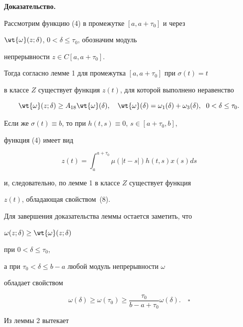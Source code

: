{\bf Доказательство.}


Рассмотрим функцию (4) в промежутке $[a,a+\tau_0]$ и через


$\wt{\omega}(z;\delta)$, $0<\delta\leq \tau_0$, обозначим модуль


непрерывности $z\in C[a,a+\tau_0]$.


Тогда согласно лемме 1 для промежутка $[a,a+\tau_0]$ при $\sigma(t)=t$


в классе $Z$ существует функция $z(t)$, для которой выполнено неравенство


\begin{equation}


\wt{\omega}(z;\delta)\geq A_{18}\wt{\omega}(\delta),\quad


\wt{\omega}(\delta)=\omega_1(\delta)+\omega_3(\delta),\ \;


0<\delta\leq \tau_0.


\end{equation}


Если же $\sigma(t)\equiv b$, то при $h(t,s)\equiv 0$, $s\in [a+\tau_0,b]$,


функция (4) имеет вид


$$


z(t)=\int_a^{a+\tau_0}\mu(|t-s|)h(t,s)x(s) ds


$$


и, следовательно, по лемме 1 в классе $Z$ существует функция


$z(t)$, обладающая свойством~(8).


Для завершения доказательства леммы остается заметить, что


$\omega(z;\delta)\geq\wt{\omega}(z;\delta)$


при $0<\delta\leq \tau_0$,


а при $\tau_0<\delta\leq b-a$ любой модуль непрерывности $\omega$


обладает свойством


$$


\omega(\delta)\geq \omega(\tau_0)\geq \frac{\tau_0}{b-a+\tau_0}


\omega(\delta).\quad\square


$$





Из леммы 2 вытекает





